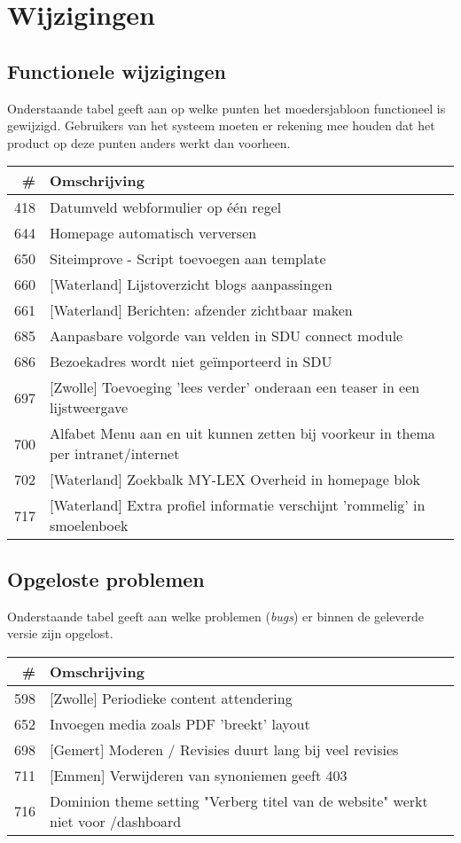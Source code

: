 \documentclass[12pt]{article}
\begin{document}
\section{Wijzigingen}
\subsection{Functionele wijzigingen}
Onderstaande tabel geeft aan op welke punten het moedersjabloon functioneel is gewijzigd. Gebruikers van het systeem moeten er rekening mee houden dat het product op deze punten anders werkt dan voorheen.

\begin{tabular}{| r | p{15cm} |}
	\hline \# & Omschrijving \\ \hline \hline
	418 & Datumveld webformulier op \'e\'en regel \\ \hline
	644 & Homepage automatisch verversen \\ \hline
	650 & Siteimprove - Script toevoegen aan template \\ \hline
	660 & [Waterland] Lijstoverzicht blogs aanpassingen \\ \hline
	661 & [Waterland] Berichten: afzender zichtbaar maken \\ \hline
	685 & Aanpasbare volgorde van velden in SDU connect module \\ \hline
	686 & Bezoekadres wordt niet ge\"importeerd in SDU \\ \hline
	697 & [Zwolle] Toevoeging 'lees verder' onderaan een teaser in een lijstweergave \\ \hline
	700 & Alfabet Menu aan en uit kunnen zetten bij voorkeur in thema per intranet/internet  \\ \hline
	702 & [Waterland] Zoekbalk MY-LEX Overheid in homepage blok \\ \hline
	717 & [Waterland] Extra profiel informatie verschijnt 'rommelig' in smoelenboek \\ \hline
\end{tabular}

\subsection{Opgeloste problemen}
Onderstaande tabel geeft aan welke problemen (\emph{bugs}) er binnen de geleverde versie zijn opgelost.

\begin{tabular}{| r | p{15cm} |}
	\hline \# & Omschrijving \\ \hline \hline
	598 & [Zwolle] Periodieke content attendering \\ \hline
	652 & Invoegen media zoals PDF 'breekt' layout \\ \hline
	698 & [Gemert] Moderen / Revisies duurt lang bij veel revisies \\ \hline
	711 & [Emmen] Verwijderen van synoniemen geeft 403 \\ \hline
	716 & Dominion theme setting "Verberg titel van de website" werkt niet voor /dashboard \\ \hline
\end{tabular}
\end{document}
